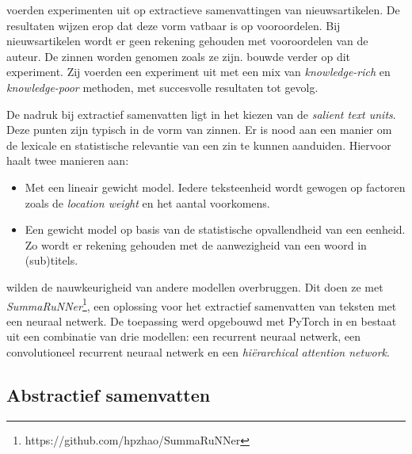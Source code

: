 
\textcite{McKeown1999} voerden experimenten uit op extractieve samenvattingen van nieuwsartikelen. De resultaten wijzen erop dat deze vorm vatbaar is op vooroordelen. Bij nieuwsartikelen wordt er geen rekening gehouden met vooroordelen van de auteur. De zinnen worden genomen zoals ze zijn. \textcite{Hahn2000} bouwde verder op dit experiment. Zij voerden een experiment uit met een mix van \textit{knowledge-rich} en \textit{knowledge-poor} methoden, met succesvolle resultaten tot gevolg.

De nadruk bij extractief samenvatten ligt in het kiezen van de \textit{salient text units}. Deze punten zijn typisch in de vorm van zinnen. Er is nood aan een manier om de lexicale en statistische relevantie van een zin te kunnen aanduiden. Hiervoor haalt \textcite{Hahn2000} twee manieren aan:

\begin{itemize}
	\item Met een lineair gewicht model. Iedere teksteenheid wordt gewogen op factoren zoals de \textit{location weight} en het aantal voorkomens.
	\item Een gewicht model op basis van de statistische opvallendheid van een eenheid. Zo wordt er rekening gehouden met de aanwezigheid van een woord in (sub)titels.
\end{itemize}


\textcite{Nallapati2017} wilden de nauwkeurigheid van andere modellen overbruggen. Dit doen ze met \textit{SummaRuNNer}\footnote{https://github.com/hpzhao/SummaRuNNer}, een oplossing voor het extractief samenvatten van teksten met een neuraal netwerk. De toepassing werd opgebouwd met PyTorch in  en bestaat uit een combinatie van drie modellen: een recurrent neuraal netwerk, een convolutioneel recurrent neuraal netwerk en een \textit{hiërarchical attention network}.

\subsection{Abstractief samenvatten}


